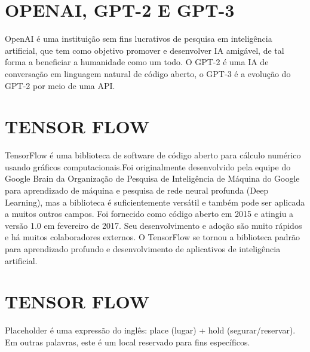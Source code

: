 \section{OPENAI, GPT-2 E GPT-3}
\label{sec:OPENAI}


OpenAI é uma instituição sem fins lucrativos de pesquisa em inteligência artificial, que tem como objetivo promover e desenvolver IA amigável, de tal forma a beneficiar a humanidade como um todo. O GPT-2 é uma IA de conversação em linguagem natural de código aberto, o GPT-3 é a evolução do GPT-2 por meio de uma API.
 \cite{OpenAI}
 
 \section{TENSOR FLOW}
 \label{sec:TENSORFLOW}
 
 TensorFlow é uma biblioteca de software de código aberto para cálculo numérico usando gráficos computacionais.Foi originalmente desenvolvido pela equipe do Google Brain da Organização de Pesquisa de Inteligência de Máquina do Google para aprendizado de máquina e pesquisa de rede neural profunda (Deep Learning), mas a biblioteca é suficientemente versátil e também pode ser aplicada a muitos outros campos. Foi fornecido como código aberto em 2015 e atingiu a versão 1.0 em fevereiro de 2017. Seu desenvolvimento e adoção são muito rápidos e há muitos colaboradores externos. O TensorFlow se tornou a biblioteca padrão para aprendizado profundo e desenvolvimento de aplicativos de inteligência artificial. \cite{datascience}
 
  \section{TENSOR FLOW}
 \label{sec:PLACEHOLDER}
 
 Placeholder é uma expressão do inglês: place (lugar) + hold (segurar/reservar). Em outras palavras, este é um local reservado para fins específicos. \cite{place}